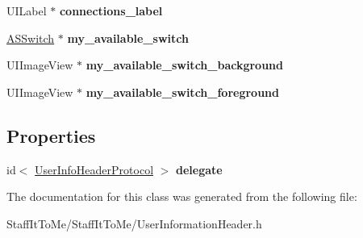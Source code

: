 \begin{DoxyCompactItemize}
\item 
\hypertarget{interface_user_information_header_a2975a82d221ee0be8e4689928e761b29}{
\-U\-I\-Label $\ast$ {\bfseries connections\-\_\-label}}
\label{interface_user_information_header_a2975a82d221ee0be8e4689928e761b29}

\item 
\hypertarget{interface_user_information_header_a42f7bedb07bfb99edd1be1880fcc6dd7}{
\hyperlink{interface_a_s_switch}{\-A\-S\-Switch} $\ast$ {\bfseries my\-\_\-available\-\_\-switch}}
\label{interface_user_information_header_a42f7bedb07bfb99edd1be1880fcc6dd7}

\item 
\hypertarget{interface_user_information_header_ad3ec61041ec7df1f8f2eda40586728c4}{
\-U\-I\-Image\-View $\ast$ {\bfseries my\-\_\-available\-\_\-switch\-\_\-background}}
\label{interface_user_information_header_ad3ec61041ec7df1f8f2eda40586728c4}

\item 
\hypertarget{interface_user_information_header_ae18199392c71a51a65816dbebc1e50d7}{
\-U\-I\-Image\-View $\ast$ {\bfseries my\-\_\-available\-\_\-switch\-\_\-foreground}}
\label{interface_user_information_header_ae18199392c71a51a65816dbebc1e50d7}

\end{DoxyCompactItemize}
\subsection*{\-Properties}
\begin{DoxyCompactItemize}
\item 
\hypertarget{interface_user_information_header_a43ac2e1a843a37f11f22d196c28fe630}{
id$<$ \hyperlink{protocol_user_info_header_protocol-p}{\-User\-Info\-Header\-Protocol} $>$ {\bfseries delegate}}
\label{interface_user_information_header_a43ac2e1a843a37f11f22d196c28fe630}

\end{DoxyCompactItemize}


\-The documentation for this class was generated from the following file\-:\begin{DoxyCompactItemize}
\item 
\-Staff\-It\-To\-Me/\-Staff\-It\-To\-Me/\-User\-Information\-Header.\-h\end{DoxyCompactItemize}
